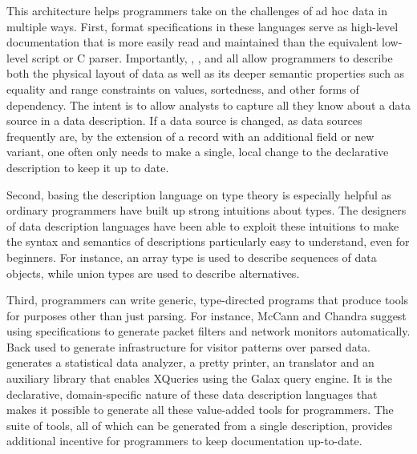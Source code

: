 This architecture helps programmers take on the challenges of ad hoc
data in multiple ways.  First, format specifications in these
languages serve as high-level documentation that is more easily read
and maintained than the equivalent low-level \perl{} script or C
parser.  Importantly, \datascript{}, \packettypes{}, and \pads{} all
allow programmers to describe both the physical layout of data as well
as its deeper semantic properties such as equality and range
constraints on values, sortedness, and other forms of dependency.  The
intent is to allow analysts to capture all they know about a data
source in a data description.  If a data source is changed, as data
sources frequently are, by the extension of a record with an
additional field or new variant, one often only needs to make a single,
local change to the declarative description to keep it up to date.

Second, basing the description language on type theory is especially helpful as
ordinary programmers have built up strong intuitions about types.  
The designers of data description languages
have been able to exploit these intuitions to make the syntax and
semantics of descriptions
particularly easy to understand, even for beginners.  For instance,
an array type is used to describe sequences of data objects, while
union types are used to describe alternatives.

Third, programmers can write generic, type-directed programs that
produce tools for purposes other than just parsing.  For instance,
McCann and Chandra suggest using \packettypes{} specifications to
generate packet filters and network monitors automatically.  Back used
\datascript{} to generate infrastructure for visitor patterns over
parsed data. \pads{} generates a statistical data analyzer, a pretty
printer, an \xml{} translator and an auxiliary library that enables
XQueries using the Galax query engine\cite{galax}.  It is the
declarative, domain-specific nature of these data description
languages that makes it possible to generate all these value-added
tools for programmers.  The suite of tools, all of which can be
generated from a single description, provides additional incentive for
programmers to keep documentation up-to-date.


